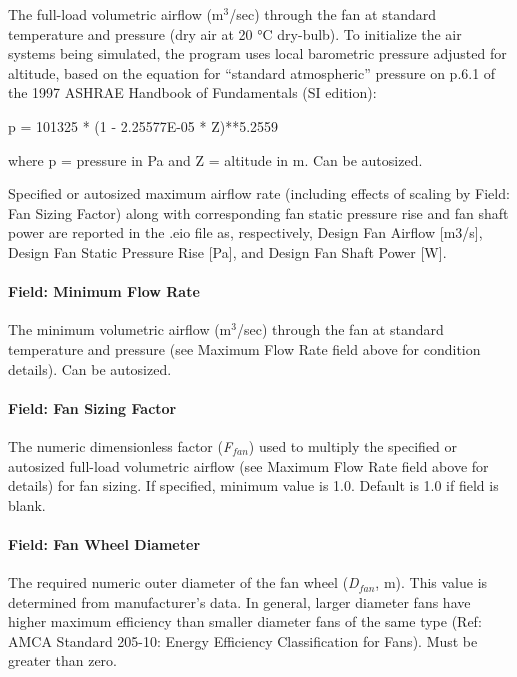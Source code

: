 The full-load volumetric airflow (m\(^{3}\)/sec) through the fan at standard temperature and pressure (dry air at 20 °C dry-bulb). To initialize the air systems being simulated, the program uses local barometric pressure adjusted for altitude, based on the equation for ``standard atmospheric'' pressure on p.6.1 of the 1997 ASHRAE Handbook of Fundamentals (SI edition):

p = 101325 * (1 - 2.25577E-05 * Z)**5.2559

where p = pressure in Pa and Z = altitude in m. Can be autosized.

Specified or autosized maximum airflow rate (including effects of scaling by Field: Fan Sizing Factor) along with corresponding fan static pressure rise and fan shaft power are reported in the .eio file as, respectively, Design Fan Airflow {[}m3/s{]}, Design Fan Static Pressure Rise {[}Pa{]}, and Design Fan Shaft Power {[}W{]}.

\paragraph{Field: Minimum Flow Rate}\label{field-minimum-flow-rate}

The minimum volumetric airflow (m\(^{3}\)/sec) through the fan at standard temperature and pressure (see Maximum Flow Rate field above for condition details). Can be autosized.

\paragraph{Field: Fan Sizing Factor}\label{field-fan-sizing-factor}

The numeric dimensionless factor (\emph{F\(_{fan}\)}) used to multiply the specified or autosized full-load volumetric airflow (see Maximum Flow Rate field above for details) for fan sizing. If specified, minimum value is 1.0. Default is 1.0 if field is blank.

\paragraph{Field: Fan Wheel Diameter}\label{field-fan-wheel-diameter}

The required numeric outer diameter of the fan wheel (\emph{D\(_{fan}\)}, m). This value is determined from manufacturer's data. In general, larger diameter fans have higher maximum efficiency than smaller diameter fans of the same type (Ref: AMCA Standard 205-10: Energy Efficiency Classification for Fans). Must be greater than zero.

